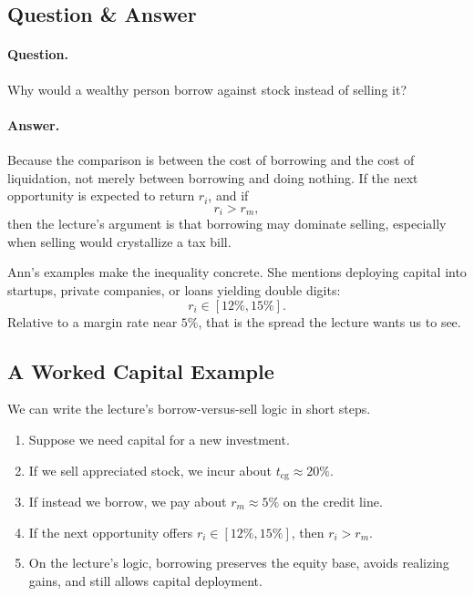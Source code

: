 \subsection{Question \& Answer}

\paragraph{Question.} Why would a wealthy person borrow against stock instead of selling it?

\paragraph{Answer.} Because the comparison is between the cost of borrowing and the cost of liquidation, not merely between borrowing and doing nothing. If the next opportunity is expected to return \(r_i\), and if
\begin{equation}
r_i > r_m,
\end{equation}
then the lecture's argument is that borrowing may dominate selling, especially when selling would crystallize a tax bill.

Ann's examples make the inequality concrete. She mentions deploying capital into startups, private companies, or loans yielding double digits:
\begin{equation}
r_i \in [12\%,15\%].
\end{equation}
Relative to a margin rate near \(5\%\), that is the spread the lecture wants us to see.

\subsection{A Worked Capital Example}

We can write the lecture's borrow-versus-sell logic in short steps.

\begin{enumerate}
\item Suppose we need capital for a new investment.
\item If we sell appreciated stock, we incur about \(t_{\mathrm{cg}} \approx 20\%\).
\item If instead we borrow, we pay about \(r_m \approx 5\%\) on the credit line.
\item If the next opportunity offers \(r_i \in [12\%,15\%]\), then \(r_i > r_m\).
\item On the lecture's logic, borrowing preserves the equity base, avoids realizing gains, and still allows capital deployment.
\end{enumerate}

